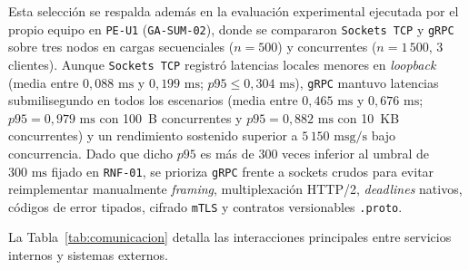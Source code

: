 \documentclass[11pt,a4paper]{article}
\begin{document}
Esta selección se respalda además en la evaluación experimental ejecutada por el propio equipo en \texttt{PE-U1} (\texttt{GA-SUM-02}), donde se compararon \texttt{Sockets TCP} y \texttt{gRPC} sobre tres nodos en cargas secuenciales ($n = 500$) y concurrentes ($n = 1\,500$, 3 clientes). Aunque \texttt{Sockets TCP} registró latencias locales menores en \textit{loopback} (media entre $0{,}088\text{ ms}$ y $0{,}199\text{ ms}$; $p95 \le 0{,}304\text{ ms}$), \texttt{gRPC} mantuvo latencias submilisegundo en todos los escenarios (media entre $0{,}465\text{ ms}$ y $0{,}676\text{ ms}$; $p95 = 0{,}979\text{ ms}$ con 100~B concurrentes y $p95 = 0{,}882\text{ ms}$ con 10~KB concurrentes) y un rendimiento sostenido superior a $5\,150\text{ msg/s}$ bajo concurrencia. Dado que dicho $p95$ es más de 300 veces inferior al umbral de $300\text{ ms}$ fijado en \texttt{RNF-01}, se prioriza \texttt{gRPC} frente a sockets crudos para evitar reimplementar manualmente \textit{framing}, multiplexación HTTP/2, \textit{deadlines} nativos, códigos de error tipados, cifrado \texttt{mTLS} y contratos versionables \texttt{.proto}.

La Tabla~\ref{tab:comunicacion} detalla las interacciones principales entre servicios internos y sistemas externos.
\end{document}
